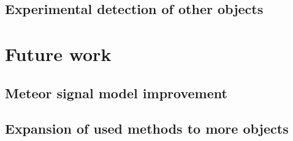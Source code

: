 \documentclass[twoside]{ctuthesis}
\theoremstyle{plain}
\theoremstyle{definition}
\theoremstyle{note}
\begin{document}
\section{Experimental detection of other objects}



\chapter{Future work}

\section{Meteor signal model improvement}

\section{Expansion of used methods to more objects}


\appendix

\printindex

\appendix



\end{document}
